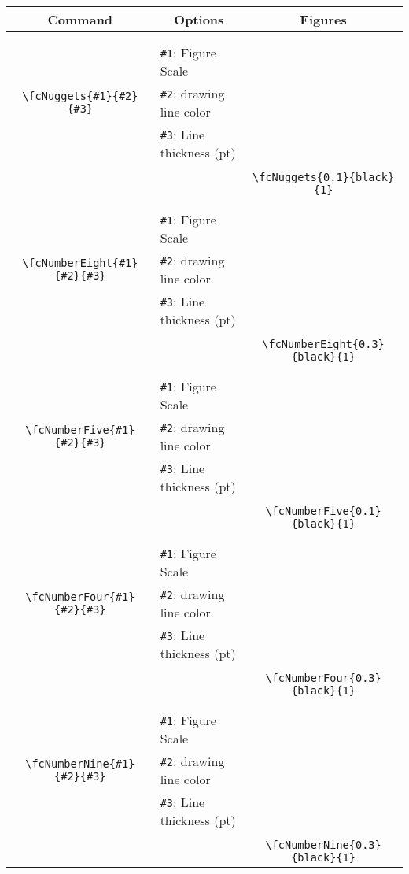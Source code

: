 \documentclass[x11names]{article}
\begin{document}
\begin{table}[H]\centering\begin{tabular}{|c|l|c|}\hline {\bf Command}& \multicolumn{1}{c|}{{\bf Options}} & {\bf Figures}\\  \hline	&&\multirow{5}{*}{\fcNuggets{0.1}{black}{1}}\\	&&\\	&\verb|#1|: Figure Scale &\\	\verb|\fcNuggets{#1}{#2}{#3}|&	\verb|#2|: drawing line color &\\	&\verb|#3|: Line thickness (pt) &\\ &&\\&&	\verb|\fcNuggets{0.1}{black}{1}|\\\hline 	
	&&\multirow{5}{*}{\fcNumberEight{0.3}{black}{1}}\\	&&\\	&\verb|#1|: Figure Scale &\\	\verb|\fcNumberEight{#1}{#2}{#3}|&	\verb|#2|: drawing line color &\\	&\verb|#3|: Line thickness (pt) &\\ &&\\&&	\verb|\fcNumberEight{0.3}{black}{1}|\\\hline 	
	&&\multirow{5}{*}{\fcNumberFive{0.1}{black}{1}}\\	&&\\	&\verb|#1|: Figure Scale &\\	\verb|\fcNumberFive{#1}{#2}{#3}|&	\verb|#2|: drawing line color &\\	&\verb|#3|: Line thickness (pt) &\\ &&\\&&	\verb|\fcNumberFive{0.1}{black}{1}|\\\hline 	
	&&\multirow{5}{*}{\fcNumberFour{0.3}{black}{1}}\\	&&\\	&\verb|#1|: Figure Scale &\\	\verb|\fcNumberFour{#1}{#2}{#3}|&	\verb|#2|: drawing line color &\\	&\verb|#3|: Line thickness (pt) &\\ &&\\&&	\verb|\fcNumberFour{0.3}{black}{1}|\\\hline 	
	&&\multirow{5}{*}{\fcNumberNine{0.3}{black}{1}}\\	&&\\	&\verb|#1|: Figure Scale &\\	\verb|\fcNumberNine{#1}{#2}{#3}|&	\verb|#2|: drawing line color &\\	&\verb|#3|: Line thickness (pt) &\\ &&\\&&	\verb|\fcNumberNine{0.3}{black}{1}|\\\hline 	

\end{tabular}
\end{table}
\end{document}
